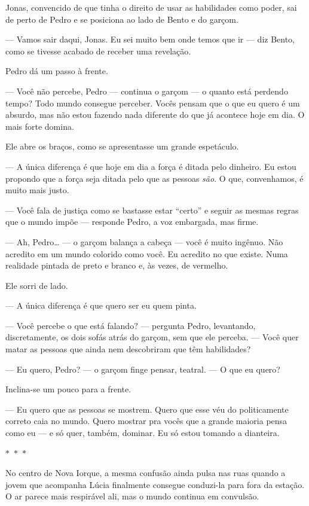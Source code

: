 Jonas, convencido de que tinha o direito de usar as habilidades como poder, sai de perto de Pedro e se posiciona ao lado de Bento e do garçom.

— Vamos sair daqui, Jonas. Eu sei muito bem onde temos que ir — diz Bento, como se tivesse acabado de receber uma revelação.

Pedro dá um passo à frente.

— Você não percebe, Pedro — continua o garçom — o quanto está perdendo tempo? Todo mundo consegue perceber.  
Vocês pensam que o que eu quero é um absurdo, mas não estou fazendo nada diferente do que já acontece hoje em dia.  
O mais forte domina.

Ele abre os braços, como se apresentasse um grande espetáculo.

— A única diferença é que hoje em dia a força é ditada pelo dinheiro.  
Eu estou propondo que a força seja ditada pelo que as pessoas \emph{são}.  
O que, convenhamos, é muito mais justo.

— Você fala de justiça como se bastasse estar “certo” e seguir as mesmas regras que o mundo impõe — responde Pedro, a voz embargada, mas firme.

— Ah, Pedro… — o garçom balança a cabeça — você é muito ingênuo. Não acredito em um mundo colorido como você.  
Eu acredito no que existe.  
Numa realidade pintada de preto e branco e, às vezes, de vermelho.

Ele sorri de lado.

— A única diferença é que quero ser eu quem pinta.

— Você percebe o que está falando? — pergunta Pedro, levantando, discretamente, os dois sofás atrás do garçom, sem que ele perceba. — Você quer matar as pessoas que ainda nem descobriram que têm habilidades?

— Eu quero, Pedro? — o garçom finge pensar, teatral. — O que eu quero?

Inclina-se um pouco para a frente.

— Eu quero que as pessoas se mostrem. Quero que esse véu do politicamente correto caia no mundo.  
Quero mostrar pra vocês que a grande maioria pensa como eu — e só quer, também, dominar.  
Eu só estou tomando a dianteira.

\begin{center}
	$\ast$~$\ast$~$\ast$
\end{center}

No centro de Nova Iorque, a mesma confusão ainda pulsa nas ruas quando a jovem que acompanha Lúcia finalmente consegue conduzi-la para fora da estação.
O ar parece mais respirável ali, mas o mundo continua em convulsão.

